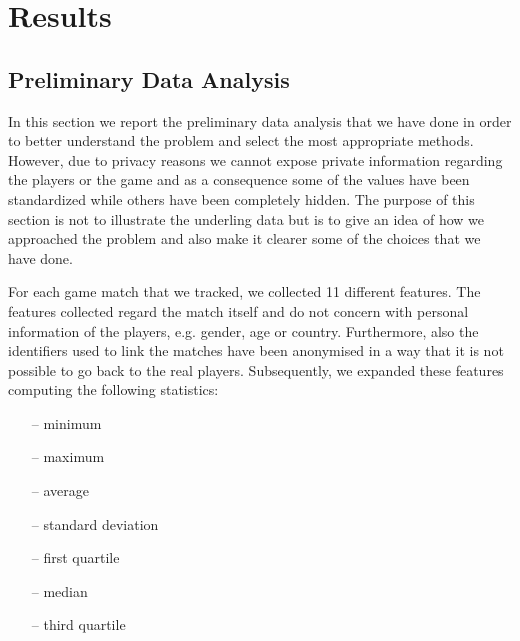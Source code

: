 \chapter{Results}
\label{chap:results}


\section{Preliminary Data Analysis}

In this section we report the preliminary data analysis that we have done in order to better understand the problem and select the most appropriate methods. However, due to privacy reasons we cannot expose private information regarding the players or the game and as a consequence some of the values have been standardized while others have been completely hidden. The purpose of this section is not to illustrate the underling data but is to give an idea of how we approached the problem and also make it clearer some of the choices that we have done.

For each game match that we tracked, we collected 11 different features. The features collected regard the match itself and do not concern with personal information of the players, e.g. gender, age or country. Furthermore, also the identifiers used to link the matches have been anonymised in a way that it is not possible to go back to the real players. Subsequently, we expanded these features computing the following statistics:
\begin{itemize}
    \item[--] minimum 
    \item[--] maximum 
    \item[--] average 
    \item[--] standard deviation
    \item[--] first quartile
    \item[--] median
    \item[--] third quartile
\end{itemize}

